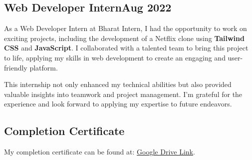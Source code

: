 \subsection{{Web Developer Intern\hfill Aug 2022 }}
\begin{zitemize}
    \item As a Web Developer Intern at Bharat Intern, I had the opportunity to work on exciting projects, including the development of a Netflix clone using \textbf{Tailwind CSS} and \textbf{JavaScript}. I collaborated with a talented team to bring this project to life, applying my skills in web development to create an engaging and user-friendly platform. 
    \item This internship not only enhanced my technical abilities but also provided valuable insights into teamwork and project management. I'm grateful for the experience and look forward to applying my expertise to future endeavors.
\end{zitemize}
\begin{zitemize}
\subsection{{Completion Certificate}}
\item My completion certificate can be found at: \href{https://drive.google.com/file/d/1kW9k5gszJlIEXFur_P-q36PIus9H_Qyk/view?usp=drivesdk}{Google Drive Link}.
\end{zitemize}

